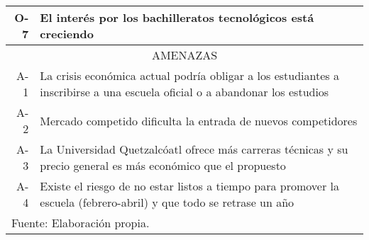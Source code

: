 \begin{table}[h!]
\begin{tabular}{r|p{5in}}
    	O-7 & El interés por los bachilleratos tecnológicos está creciendo \\
    	\hline
    	\multicolumn{2}{c}{AMENAZAS} \\
    	\hline
    	\hline
    	A-1 & La crisis económica actual podría obligar a los estudiantes a inscribirse a una escuela oficial o a abandonar los estudios \\
    	A-2 & Mercado competido dificulta la entrada de nuevos competidores \\
    	A-3 & La Universidad Quetzalcóatl ofrece más carreras técnicas y su precio general es más económico que el propuesto \\
    	A-4 & Existe el riesgo de no estar listos a tiempo para promover la escuela (febrero-abril) y que todo se retrase un año \\
    	\hline
    	\multicolumn{2}{l}{\footnotesize Fuente: Elaboración propia.} \\
    \end{tabular}
\end{table}

